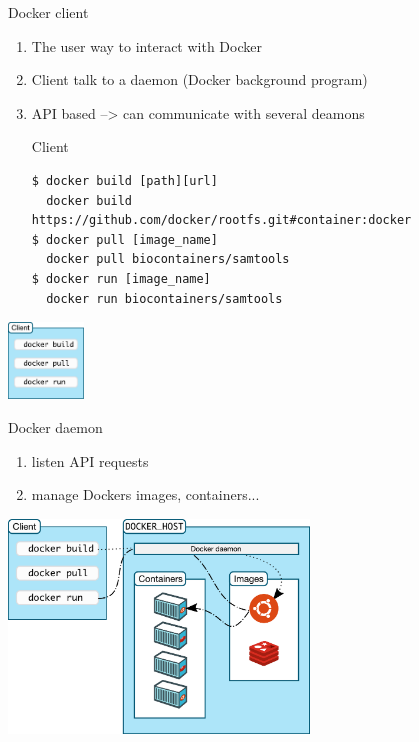 \begin{frame}[<+->][fragile]{Docker client}
\begin{enumerate}
\item The user way to interact with Docker
\item Client talk to a daemon (Docker background program)
\item API based --> can communicate with several deamons
\begin{block}{Client}
\begin{verbatim}
$ docker build [path][url] 
  docker build https://github.com/docker/rootfs.git#container:docker
$ docker pull [image_name]
  docker pull biocontainers/samtools
$ docker run [image_name]
  docker run biocontainers/samtools
\end{verbatim}
\end{block}
\end{enumerate}
\begin{center}
\includegraphics[width=0.15\textwidth]{images/docker_arch_1.pdf}
\end{center}
\end{frame}

\begin{frame}[<+->]{Docker daemon}
\begin{enumerate}
\item listen API requests
\item manage Dockers images, containers...
\end{enumerate}
\centering\includegraphics[width=0.6\textwidth]{images/docker_arch_2.pdf}
\end{frame}

